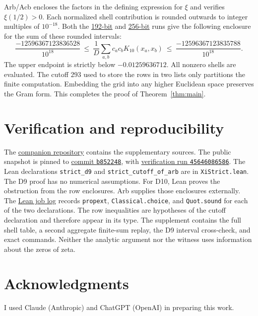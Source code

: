 \documentclass[11pt]{article}
\begin{document}
Arb/Acb \cite{Johansson} encloses the factors in the defining expression
for $\xi$ and verifies $\xi(1/2)>0$. Each normalized shell contribution
is rounded outwards to integer multiples of $10^{-18}$. Both the
\href{https://github.com/iqwalker-debug/xi-positive-definiteness-/actions/runs/45646086586/job/139317344510}{192-bit} and
\href{https://github.com/iqwalker-debug/xi-positive-definiteness-/actions/runs/45646086586/job/139317344794}{256-bit} runs give the following enclosure for the sum
of these rounded intervals:
\[
 \frac{-12596367123836528}{10^{18}}
 \ \le\ \frac1D\sum_{a,b}c_ac_bK_{10}(x_a,x_b)
 \ \le\ \frac{-12596367123835788}{10^{18}}.
\]
The upper endpoint is strictly below $-0.01259636712$.
All nonzero shells are evaluated. The cutoff $293$ used to store
the rows in two lists only partitions the finite computation.
Embedding the grid into any higher Euclidean space preserves the Gram
form. This completes the proof of Theorem~\ref{thm:main}.

\section{Verification and reproducibility}
The \href{https://github.com/iqwalker-debug/xi-positive-definiteness-}{companion repository} contains the supplementary sources.
The public snapshot is pinned to
\href{https://github.com/iqwalker-debug/xi-positive-definiteness-/commit/b85224897e27d51141b85c98bad5173c78211dce}{commit \texttt{b852248}},
with \href{https://github.com/iqwalker-debug/xi-positive-definiteness-/actions/runs/45646086586}{verification run \texttt{45646086586}}.
The Lean declarations \texttt{strict\_d9} and
\texttt{strict\_cutoff\_of\_arb} are in \texttt{XiStrict.lean}.
The D9 proof has no numerical assumptions. For D10, Lean proves the
obstruction from the row enclosures. Arb supplies those enclosures
externally. The \href{https://github.com/iqwalker-debug/xi-positive-definiteness-/actions/runs/45646086586/job/139317344090}{Lean job log}
records \texttt{propext}, \texttt{Classical.choice}, and
\texttt{Quot.sound} for each of the two declarations. The row inequalities
are hypotheses of the cutoff declaration and therefore appear in its type.
The supplement contains the full shell table, a second
aggregate finite-sum replay, the D9 interval cross-check, and exact
commands. Neither the analytic argument nor the witness uses
information about the zeros of zeta.


\section*{Acknowledgments}
I used Claude (Anthropic) and ChatGPT (OpenAI) in preparing this work.
\end{document}
